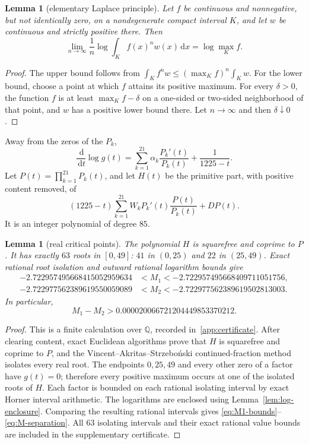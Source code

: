\documentclass[preprint,12pt]{elsarticle}
\newtheorem{lemma}[theorem]{Lemma}
\newtheorem{certificate}[theorem]{Lemma}
\theoremstyle{definition}
\newcommand{\Q}{\mathbb Q}
\newcommand{\dd}{\,\mathrm d}
\begin{document}
\begin{lemma}[elementary Laplace principle]\label{lem:laplace}
Let $f$ be continuous and nonnegative, but not identically zero, on a
nondegenerate compact interval $K$, and let $w$ be continuous and strictly
positive there.  Then
\[
 \lim_{n\to\infty}\frac1n
 \log\int_K f(x)^n w(x)\dd x
 =\log\max_K f.
\]
\end{lemma}

\begin{proof}
The upper bound follows from
$\int_K f^n w\le(\max_K f)^n\int_K w$.  For the lower bound, choose a point at
which $f$ attains its positive maximum.  For every $\delta>0$, the function
$f$ is at least $\max_K f-\delta$ on a one-sided or two-sided neighborhood
of that point, and $w$ has a positive lower bound there.  Let $n\to\infty$
and then $\delta\downarrow0$.
\end{proof}

Away from the zeros of the $P_k$,
\[
 \frac{\dd}{\dd t}\log g(t)
 =\sum_{k=1}^{21}\alpha_k\frac{P_k'(t)}{P_k(t)}
 +\frac1{1225-t}.
\]
Let $P(t)=\prod_{k=1}^{21}P_k(t)$, and let $H(t)$ be the primitive part,
with positive content removed, of
\begin{equation}\label{eq:H}
 (1225-t)\sum_{k=1}^{21}W_k P_k'(t)\frac{P(t)}{P_k(t)}
 +DP(t).
\end{equation}
It is an integer polynomial of degree $85$.

\begin{certificate}[real critical points]\label{cert:real}
The polynomial $H$ is squarefree and coprime to $P$.  It has exactly $63$
roots in $[0,49]$: $41$ in $(0,25)$ and $22$ in $(25,49)$.  Exact rational
root isolation and outward rational logarithm bounds give
\begin{align}
 -2.722957495668415052959634
 &<M_1<
 -2.722957495668409711051756,
 \label{eq:M1-bounds}\\
 -2.722977562389619550059089
 &<M_2<
 -2.722977562389619502813003.
 \label{eq:M2-bounds}
\end{align}
In particular,
\begin{equation}\label{eq:M-separation}
 M_1-M_2>0.000020066721204449853370212.
\end{equation}
\end{certificate}

\begin{proof}
This is a finite calculation over $\Q$, recorded in~\ref{app:certificate}.
After clearing content, exact Euclidean
algorithms prove that $H$ is squarefree and coprime to $P$, and the
Vincent--Akritas--Strzebo\'nski continued-fraction method isolates every real
root.
The endpoints $0,25,49$ and every other zero of a factor have $g(t)=0$;
therefore every positive maximum occurs at one of the isolated roots of
$H$.  Each factor is bounded on each rational isolating interval by exact
Horner interval arithmetic.  The logarithms are enclosed using
Lemma~\ref{lem:log-enclosure}.  Comparing the resulting rational intervals
gives \eqref{eq:M1-bounds}--\eqref{eq:M-separation}.  All $63$ isolating
intervals and their exact rational value bounds are included in the
supplementary certificate.
\end{proof}
\end{document}
